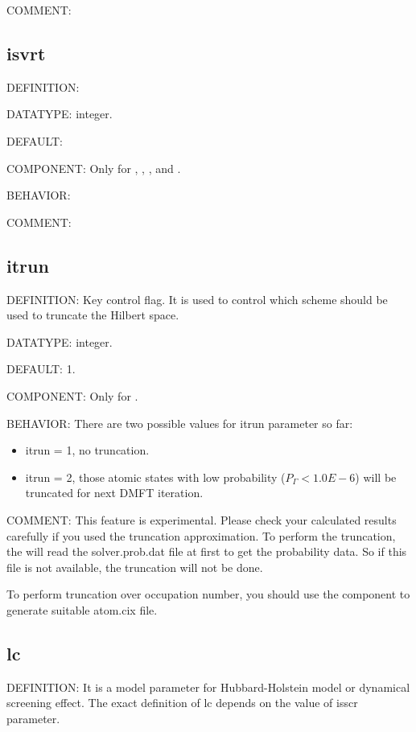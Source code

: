 {\color{olive}COMMENT:}

\subsection{isvrt}
{\color{red}DEFINITION:}

{\color{green}DATATYPE:} integer.

{\color{blue}DEFAULT:}

{\color{brown}COMPONENT:} Only for {\gardenia}, {\narcissus}, {\lavender}, and {\manjushaka}.

{\color{purple}BEHAVIOR:}

{\color{olive}COMMENT:}

\subsection{itrun}
{\color{red}DEFINITION:} Key control flag. It is used to control which scheme should be used to truncate the Hilbert space.

{\color{green}DATATYPE:} integer.

{\color{blue}DEFAULT:} 1.

{\color{brown}COMPONENT:} Only for {\manjushaka}.

{\color{purple}BEHAVIOR:} There are two possible values for itrun parameter so far:
\begin{itemize}
\item itrun = 1, no truncation.
\item itrun = 2, those atomic states with low probability ($P_{\Gamma} < 1.0E-6$) will be truncated for next DMFT iteration.
\end{itemize}

{\color{olive}COMMENT:} This feature is experimental. Please check your calculated results carefully if you used the truncation approximation. To perform the truncation, the {\manjushaka} will read the solver.prob.dat file at first to get the probability data. So if this file is not available, the truncation will not be done.

To perform truncation over occupation number, you should use the {\jasmine} component to generate suitable atom.cix file.

\subsection{lc}
{\color{red}DEFINITION:} It is a model parameter for Hubbard-Holstein model or dynamical screening effect. The exact definition of lc depends on the value of isscr parameter.

